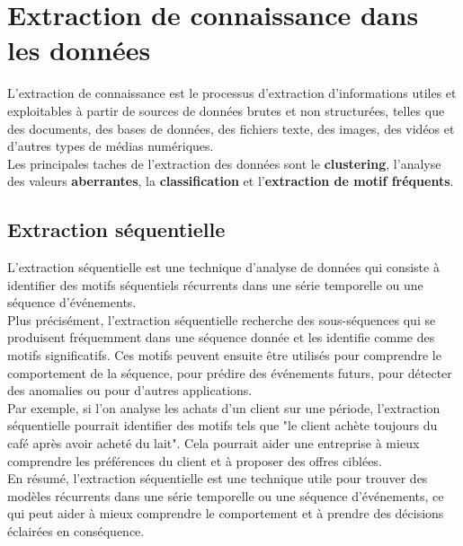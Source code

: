 
\section{Extraction de connaissance dans les données}
\label{extraction}

L'extraction de connaissance est le processus d'extraction d'informations utiles et exploitables à partir de sources de données brutes et non structurées, telles que des documents, des bases de données, des fichiers texte, des images, des vidéos et d'autres types de médias numériques.\\
Les principales taches de l'extraction des données sont le \textbf{clustering}, l'analyse des valeurs \textbf{aberrantes}, la \textbf{classification} et l'\textbf{extraction de motif fréquents}.
\subsection{Extraction séquentielle}
L'extraction séquentielle est une technique d'analyse de données qui consiste à identifier des motifs séquentiels récurrents dans une série temporelle ou une séquence d'événements.\\
Plus précisément, l'extraction séquentielle recherche des sous-séquences qui se produisent fréquemment dans une séquence donnée et les identifie comme des motifs significatifs. Ces motifs peuvent ensuite être utilisés pour comprendre le comportement de la séquence, pour prédire des événements futurs, pour détecter des anomalies ou pour d'autres applications.\\
Par exemple, si l'on analyse les achats d'un client sur une période, l'extraction séquentielle pourrait identifier des motifs tels que "le client achète toujours du café après avoir acheté du lait". Cela pourrait aider une entreprise à mieux comprendre les préférences du client et à proposer des offres ciblées.\\
En résumé, l'extraction séquentielle est une technique utile pour trouver des modèles récurrents dans une série temporelle ou une séquence d'événements, ce qui peut aider à mieux comprendre le comportement et à prendre des décisions éclairées en conséquence.
